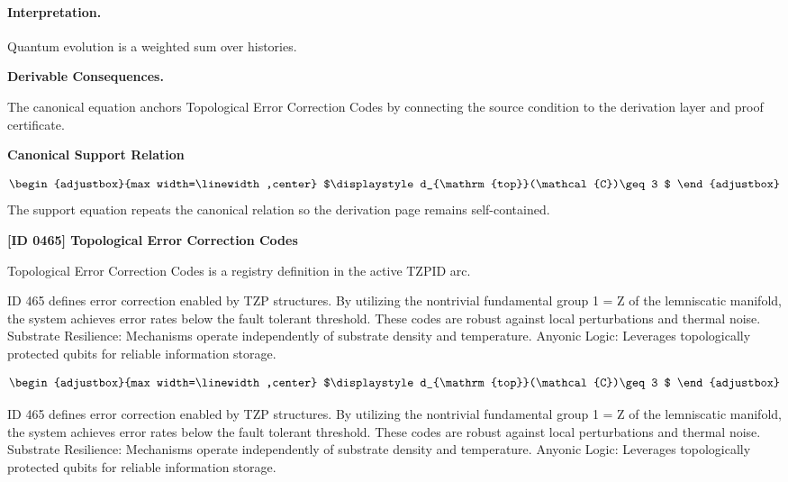 \paragraph{Interpretation.}
Quantum evolution is a weighted sum over histories.

\par\vspace{0.35em}
\noindent\textbf{Derivable Consequences.}\quad
\begingroup
\footnotesize
\raggedright
The canonical equation anchors Topological Error Correction Codes by connecting the source condition to the derivation layer and proof certificate.
\par\endgroup

\noindent\textbf{Canonical Support Relation}\par
\[
\begin{adjustbox}{max width=\linewidth,center}
$\displaystyle
d_{\mathrm{top}}(\mathcal{C})\geq3
$
\end{adjustbox}
\]
\noindent The support equation repeats the canonical relation so the derivation page remains self-contained.\par

\clearpage
\noindent\textbf{[ID 0465] Topological Error Correction Codes}\par
\vspace{0.35em}
\begingroup\small
{}
Topological Error Correction Codes is a registry definition in the active TZPID arc.

ID 465 defines error correction enabled by TZP structures. By utilizing the nontrivial fundamental group 1 = Z of the lemniscatic manifold, the system achieves error rates below the fault tolerant threshold. These codes are robust against local perturbations and thermal noise. Substrate Resilience: Mechanisms operate independently of substrate density and temperature. Anyonic Logic: Leverages topologically protected qubits for reliable information storage.

\[
\begin{adjustbox}{max width=\linewidth,center}
$\displaystyle
d_{\mathrm{top}}(\mathcal{C})\geq3
$
\end{adjustbox}
\]

ID 465 defines error correction enabled by TZP structures. By utilizing the nontrivial fundamental group 1 = Z of the lemniscatic manifold, the system achieves error rates below the fault tolerant threshold. These codes are robust against local perturbations and thermal noise. Substrate Resilience: Mechanisms operate independently of substrate density and temperature. Anyonic Logic: Leverages topologically protected qubits for reliable information storage.

